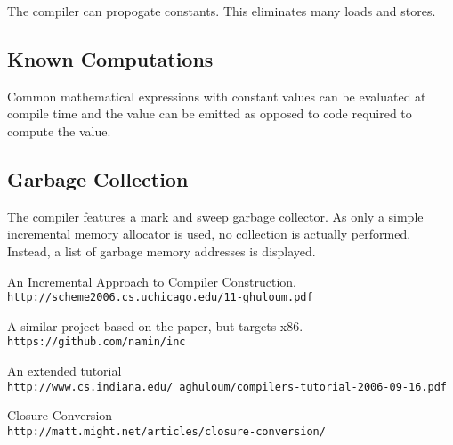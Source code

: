 \documentclass{article}
\begin{document}
The compiler can propogate constants. This eliminates many loads and stores.

\subsection{Known Computations}

Common mathematical expressions with constant values can be evaluated at compile time and the value can be emitted as opposed to code required to compute the value.

\subsection{Garbage Collection}

The compiler features a mark and sweep garbage collector. As only a simple incremental memory allocator is used, no collection is actually performed. Instead, a list of garbage memory addresses is displayed. 

\begin{thebibliography}{5}

An Incremental Approach to Compiler Construction.
\\\texttt{http://scheme2006.cs.uchicago.edu/11-ghuloum.pdf}

A similar project based on the paper, but targets x86.
\\\texttt{https://github.com/namin/inc}

An extended tutorial 
\\\texttt{http://www.cs.indiana.edu/~aghuloum/compilers-tutorial-2006-09-16.pdf}

Closure Conversion
\\\texttt{http://matt.might.net/articles/closure-conversion/}


\end{thebibliography}  
\end{document}
